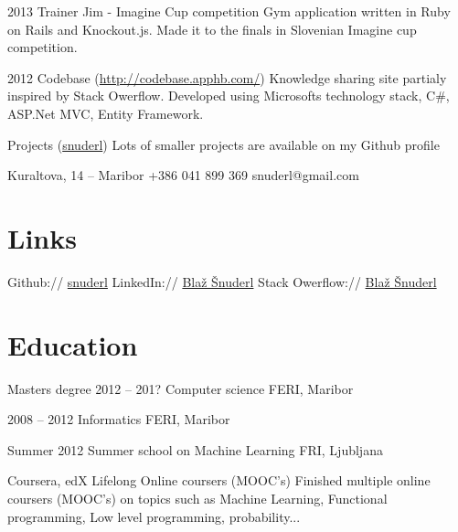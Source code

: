 \documentclass{tccv}
\begin{document}
\begin{yearlist}

\item{2013}
     {Trainer Jim - Imagine Cup competition}
     {Gym application written in Ruby on Rails and Knockout.js. Made it to the finals in Slovenian Imagine cup competition.}

\item{2012}
     {Codebase (\href{http://codebase.apphb.com/}{http://codebase.apphb.com/})}
     {Knowledge sharing site partialy inspired by Stack Owerflow. Developed using Microsofts technology stack, C\#, ASP.Net MVC, Entity Framework.}

\item{}
     {Projects (\href{https://github.com/snuderl}{snuderl})}
     {Lots of smaller projects are available on my Github profile}

\end{yearlist}




\personal
    {Kuraltova, 14 -- Maribor}
    {+386 041 899 369}
    {snuderl@gmail.com}
    
\section{Links} 
Github:// \href{https://github.com/snuderl}{snuderl} \newline
LinkedIn://  \href{https://www.linkedin.com/pub/bla\%C5\%BE-\%C5\%A1nuderl/25/679/b84}{Blaž Šnuderl} \newline
Stack Owerflow:// \href{http://stackoverflow.com/users/928489/bla\%C5\%BE-\%C5\%A1nuderl}{Blaž Šnuderl}

\section{Education}

\begin{yearlist}

\item[Masters degree]{2012 -- 201?}
     {Computer science}
     {FERI, Maribor}

\item{2008 -- 2012}
     {Informatics}
     {FERI, Maribor}
     
\item{Summer 2012}
    {Summer school on Machine Learning}
    {FRI, Ljubljana}
     
\item[Coursera, edX]
    {Lifelong}
    {Online coursers (MOOC's)}
    {Finished multiple online coursers (MOOC's) on topics such as Machine Learning, Functional programming, Low level programming, probability...}

\end{yearlist} 
\end{document}
